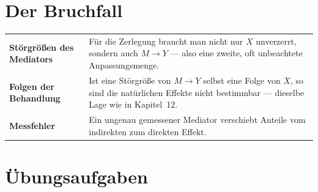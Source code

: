 \section{Der Bruchfall}

\begin{warnung}
\begin{center}
{\small
\renewcommand{\arraystretch}{1.52}
\begin{tabular}{@{}P{2.8cm}P{5.8cm}@{}}
\toprule
\textbf{Störgrößen des Mediators} & Für die Zerlegung braucht man nicht nur $X$ unverzerrt, sondern auch $M \to Y$ --- also eine zweite, oft unbeachtete Anpassungsmenge.\\
\textbf{Folgen der Behandlung} & Ist eine Störgröße von $M \to Y$ selbst eine Folge von $X$, so sind die natürlichen Effekte nicht bestimmbar --- dieselbe Lage wie in Kapitel~12.\\
\textbf{Messfehler} & Ein ungenau gemessener Mediator verschiebt Anteile vom indirekten zum direkten Effekt.\\
\bottomrule
\end{tabular}}
\end{center}

\begin{center}
\begin{minipage}{0.88\textwidth}
\end{minipage}
\end{center}
\end{warnung}

\section{Übungsaufgaben}

